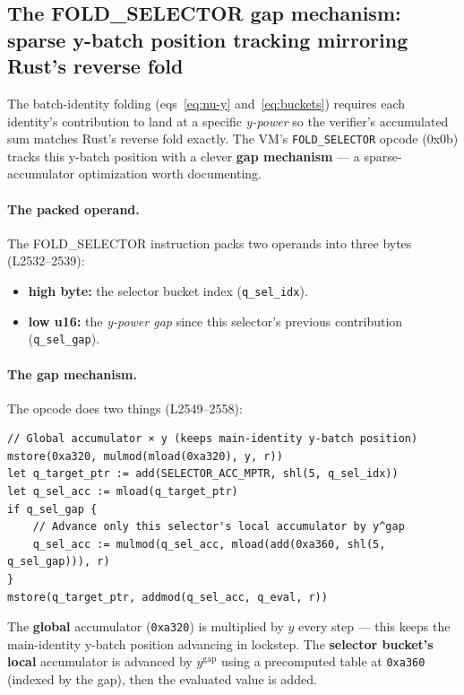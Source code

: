 \subsection{The FOLD\_SELECTOR gap mechanism: sparse y-batch position tracking mirroring Rust's reverse fold}
\label{sec:pr-foldgap}

The batch-identity folding (eqs~\eqref{eq:nu-y}
and~\eqref{eq:buckets}) requires each
identity's contribution to land at a specific \emph{y-power} so
the verifier's accumulated sum matches Rust's reverse fold
exactly. The VM's \texttt{FOLD\_SELECTOR} opcode (0x0b) tracks
this y-batch position with a clever \textbf{gap mechanism} --- a
sparse-accumulator optimization worth documenting.

\paragraph{The packed operand.} The FOLD\_SELECTOR instruction
packs two operands into three bytes (L2532--2539):
\begin{itemize}
\item \textbf{high byte:} the selector bucket index
  (\texttt{q\_sel\_idx}).
\item \textbf{low u16:} the \emph{y-power gap} since this
  selector's previous contribution (\texttt{q\_sel\_gap}).
\end{itemize}

\paragraph{The gap mechanism.} The opcode does two things
(L2549--2558):
\begin{lstlisting}[style=yul]
// Global accumulator × y (keeps main-identity y-batch position)
mstore(0xa320, mulmod(mload(0xa320), y, r))
let q_target_ptr := add(SELECTOR_ACC_MPTR, shl(5, q_sel_idx))
let q_sel_acc := mload(q_target_ptr)
if q_sel_gap {
    // Advance only this selector's local accumulator by y^gap
    q_sel_acc := mulmod(q_sel_acc, mload(add(0xa360, shl(5, q_sel_gap))), r)
}
mstore(q_target_ptr, addmod(q_sel_acc, q_eval, r))
\end{lstlisting}
The \textbf{global} accumulator (\texttt{0xa320}) is multiplied
by $y$ every step --- this keeps the main-identity y-batch position
advancing in lockstep. The \textbf{selector bucket's local}
accumulator is advanced by $y^{\text{gap}}$ using a precomputed
table at \texttt{0xa360} (indexed by the gap), then the evaluated
value is added.

